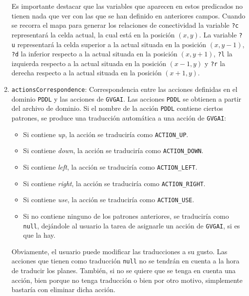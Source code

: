 \begin{enumerate}
    Es importante destacar que las variables que aparecen en estos predicados no tienen nada que ver
    con las que se han definido en anteriores campos. Cuando se recorra el mapa para generar los relaciones
    de conectividad la variable \texttt{?c} representará la celda actual, la cual está en la posición $(x,y)$.
    La variable \texttt{?u} representará la celda superior a la actual situada en la posición $(x, y-1)$,
    \texttt{?d} la inferior respecto a la actual situada en la posición $(x, y+1)$, \texttt{?l} la izquierda
    respecto a la actual situada en la posición $(x-1, y)$ y \texttt{?r} la derecha respecto a la actual 
    situada en la posición $(x+1, y)$.
    
    \item \texttt{actionsCorrespondence}: Correspondencia entre las acciones definidas en el dominio
    \texttt{PDDL} y las acciones de \texttt{GVGAI}. Las acciones \texttt{PDDL} se obtienen
    a partir del archivo de dominio. Si el nombre de la acción \texttt{PDDL} contiene ciertos
    patrones, se produce una traducción automática a una acción de \texttt{GVGAI}:
    
    \begin{itemize}[label=\textbullet]
        \item Si contiene \textit{up}, la acción se traduciría como \texttt{ACTION\_UP}.
        \item Si contiene \textit{down}, la acción se traduciría como \texttt{ACTION\_DOWN}.
        \item Si contiene \textit{left}, la acción se traduciría como \texttt{ACTION\_LEFT}.
        \item Si contiene \textit{right}, la acción se traduciría como \texttt{ACTION\_RIGHT}.
        \item Si contiene \textit{use}, la acción se traduciría como \texttt{ACTION\_USE}.
        \item Si no contiene ninguno de los patrones anteriores, se traduciría como \texttt{null},
        dejándole al usuario la tarea de asignarle un acción de \texttt{GVGAI}, si es que la hay.
    \end{itemize}
    
    Obviamente, el usuario puede modificar las traducciones a su gusto. Las acciones que tienen
    como traducción \texttt{null} no se tendrán en cuenta a la hora de traducir los planes. También,
    si no se quiere que se tenga en cuenta una acción, bien porque no tenga traducción o bien por otro
    motivo, simplemente bastaría con eliminar dicha acción.
    

\end{enumerate}
